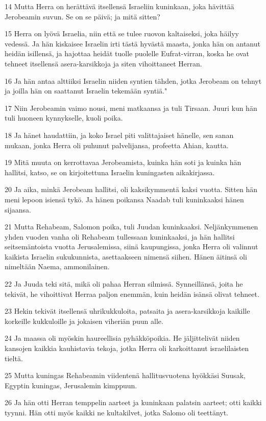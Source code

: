 \par 14 Mutta Herra on herättävä itsellensä Israeliin kuninkaan, joka hävittää Jerobeamin suvun. Se on se päivä; ja mitä sitten?
\par 15 Herra on lyövä Israelia, niin että se tulee ruovon kaltaiseksi, joka häilyy vedessä. Ja hän kiskaisee Israelin irti tästä hyvästä maasta, jonka hän on antanut heidän isillensä, ja hajottaa heidät tuolle puolelle Eufrat-virran, koska he ovat tehneet itsellensä asera-karsikkoja ja siten vihoittaneet Herran.
\par 16 Ja hän antaa alttiiksi Israelin niiden syntien tähden, jotka Jerobeam on tehnyt ja joilla hän on saattanut Israelin tekemään syntiä."
\par 17 Niin Jerobeamin vaimo nousi, meni matkaansa ja tuli Tirsaan. Juuri kun hän tuli huoneen kynnykselle, kuoli poika.
\par 18 Ja hänet haudattiin, ja koko Israel piti valittajaiset hänelle, sen sanan mukaan, jonka Herra oli puhunut palvelijansa, profeetta Ahian, kautta.
\par 19 Mitä muuta on kerrottavaa Jerobeamista, kuinka hän soti ja kuinka hän hallitsi, katso, se on kirjoitettuna Israelin kuningasten aikakirjassa.
\par 20 Ja aika, minkä Jerobeam hallitsi, oli kaksikymmentä kaksi vuotta. Sitten hän meni lepoon isiensä tykö. Ja hänen poikansa Naadab tuli kuninkaaksi hänen sijaansa.
\par 21 Mutta Rehabeam, Salomon poika, tuli Juudan kuninkaaksi. Neljänkymmenen yhden vuoden vanha oli Rehabeam tullessaan kuninkaaksi, ja hän hallitsi seitsemäntoista vuotta Jerusalemissa, siinä kaupungissa, jonka Herra oli valinnut kaikista Israelin sukukunnista, asettaakseen nimensä siihen. Hänen äitinsä oli nimeltään Naema, ammonilainen.
\par 22 Ja Juuda teki sitä, mikä oli pahaa Herran silmissä. Synneillänsä, joita he tekivät, he vihoittivat Herraa paljon enemmän, kuin heidän isänsä olivat tehneet.
\par 23 Hekin tekivät itsellensä uhrikukkuloita, patsaita ja asera-karsikkoja kaikille korkeille kukkuloille ja jokaisen viheriän puun alle.
\par 24 Ja maassa oli myöskin haureellisia pyhäkköpoikia. He jäljittelivät niiden kansojen kaikkia kauhistavia tekoja, jotka Herra oli karkoittanut israelilaisten tieltä.
\par 25 Mutta kuningas Rehabeamin viidentenä hallitusvuotena hyökkäsi Suusak, Egyptin kuningas, Jerusalemin kimppuun.
\par 26 Ja hän otti Herran temppelin aarteet ja kuninkaan palatsin aarteet; otti kaikki tyynni. Hän otti myös kaikki ne kultakilvet, jotka Salomo oli teettänyt.
